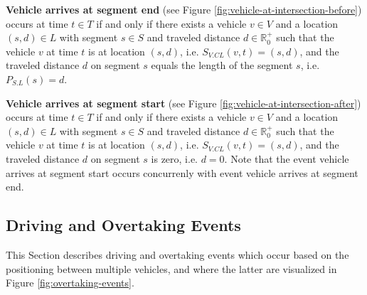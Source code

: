 \documentclass[graybox]{svmult}
\begin{document}
\noindent
\textbf{Vehicle arrives at segment end} (see Figure \ref{fig:vehicle-at-intersection-before})
occurs at time $t \in T$ if and only if there exists a vehicle $v \in V$ and a location $(s,d) \in L$ with segment $s \in S$ and traveled distance $d \in \mathbb{R}_0^+$ such that the vehicle $v$ at time $t$ is at location $(s,d)$, i.e. $S_{V.CL}(v,t) = (s,d)$, and the traveled distance $d$ on segment $s$ equals the length of the segment $s$, i.e. $P_{S.L}(s) = d$.

\vspace{4mm}
\noindent
\textbf{Vehicle arrives at segment start} (see Figure \ref{fig:vehicle-at-intersection-after})
occurs at time $t \in T$ if and only if there exists a vehicle $v \in V$ and a location $(s,d) \in L$ with segment $s \in S$ and traveled distance $d \in \mathbb{R}_0^+$ such that the vehicle $v$ at time $t$ is at location $(s,d)$, i.e. $S_{V.CL}(v,t) = (s,d)$, and the traveled distance $d$ on segment $s$ is zero, i.e. $d = 0$. Note that the event vehicle arrives at segment start occurs concurrenly with event vehicle arrives at segment end.
\vspace{-2mm}

\subsection{Driving and Overtaking Events}
\label{sec:overtaking-events}

This Section describes driving and overtaking events which occur based on the positioning between multiple vehicles, and where the latter are visualized in Figure \ref{fig:overtaking-events}.
\end{document}
